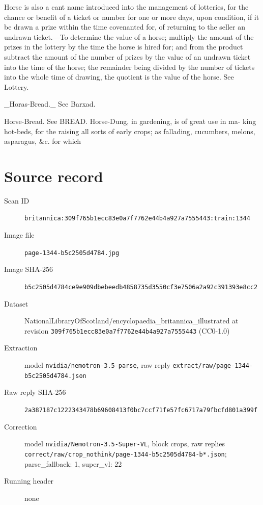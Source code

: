 \documentclass{article}
\begin{document}
Horse is also a cant name introduced into the management of lotteries, for the chance or benefit of a ticket or number for one or more days, upon condition, if it be drawn a prize within the time covenanted for, of returning to the seller an undrawn ticket.—To determine the value of a horse; multiply the amount of the prizes in the lottery by the time the horse is hired for; and from the product subtract the amount of the number of prizes by the value of an undrawn ticket into the time of the horse; the remainder being divided by the number of tickets into the whole time of drawing, the quotient is the value of the horse. See Lottery.

\_Horas-Bread.\_ See Barxad.

Horse-Bread. See BREAD.
Horse-Dung, in gardening, is of great use in ma-
king hot-beds, for the raising all sorts of early crops;
as fallading, cucumbers, melons, asparagus, \&c. for
which


\section*{Source record}
\begin{description}
\item[Scan ID] \texttt{britannica:309f765b1ecc83e0a7f7762e44b4a927a7555443:train:1344}
\item[Image file] \texttt{page-1344-b5c2505d4784.jpg}
\item[Image SHA-256] \texttt{b5c2505d4784ce9e909dbebeedb4858735d3550cf3e7506a2a92c391393e8cc2}
\item[Dataset] NationalLibraryOfScotland/encyclopaedia\_britannica\_illustrated at revision \texttt{309f765b1ecc83e0a7f7762e44b4a927a7555443} (CC0-1.0)
\item[Extraction] model \texttt{nvidia/nemotron-3.5-parse}, raw reply \texttt{extract/raw/page-1344-b5c2505d4784.json}
\item[Raw reply SHA-256] \texttt{2a387187c1222343478b69608413f0bc7ccf71fe57fc6717a79fbcfd801a399f}
\item[Correction] model \texttt{nvidia/Nemotron-3.5-Super-VL}, block crops, raw replies \texttt{correct/raw/crop\_nothink/page-1344-b5c2505d4784-b*.json}; parse\_fallback: 1, super\_vl: 22
\item[Running header] none
\end{description}
\end{document}
